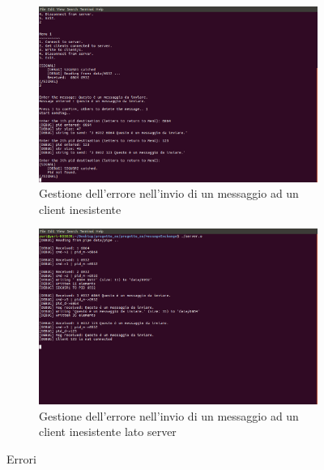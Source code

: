 \begin{figure}
\centering
\begin{subfigure}[b]{0.8\textwidth}
\includegraphics[width=\textwidth]{screenmsg/11_client_6932}
\caption{Gestione dell'errore nell'invio di un messaggio ad un client inesistente}
\end{subfigure}
\begin{subfigure}[b]{0.8\textwidth}
\includegraphics[width=\textwidth]{screenmsg/12_server}
\caption{Gestione dell'errore nell'invio di un messaggio ad un client inesistente lato server}
\end{subfigure}
\caption{Errori}
\end{figure}

